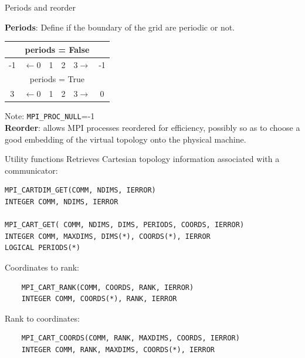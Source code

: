 \documentclass[aspectratio=43]{beamer}
\begin{document}
\begin{frame}[fragile]{Periods and reorder}

\textbf{Periods}: Define if the boundary of the grid are periodic or not.\\
\begin{center}
\begin{tabular}{cccccc}
    \multicolumn{6}{c}{periods = False} \\\hline
    \color{cscsred}-1 & $\leftarrow$\color{cscsblue}0 &\color{cscsblue}1 & \color{cscsblue}2 & {\color{cscsblue}3}$\rightarrow$ & \color{cscsred}-1\\\hline
    \multicolumn{6}{c}{periods = True} \\\hline
    \color{cscsred}3 & $\leftarrow$\color{cscsblue}0 & \color{cscsblue}1 & \color{cscsblue}2 & {\color{cscsblue}3}$\rightarrow$ & \color{cscsred}0\\\hline
\end{tabular}
\end{center}
Note: \verb+MPI_PROC_NULL+=-1\\[0.3cm]

\textbf{Reorder}: allows MPI processes reordered for efficiency, possibly so as to choose a good embedding of the virtual topology onto the physical machine.

\end{frame}

\begin{frame}[fragile]{Utility functions}
Retrieves Cartesian topology information associated with a communicator:
\footnotesize
\begin{verbatim}
MPI_CARTDIM_GET(COMM, NDIMS, IERROR)
INTEGER COMM, NDIMS, IERROR

MPI_CART_GET( COMM, NDIMS, DIMS, PERIODS, COORDS, IERROR)
INTEGER COMM, MAXDIMS, DIMS(*), COORDS(*), IERROR
LOGICAL PERIODS(*)
\end{verbatim}
\normalsize
Coordinates to rank:
\footnotesize
\begin{verbatim}
    MPI_CART_RANK(COMM, COORDS, RANK, IERROR)
    INTEGER COMM, COORDS(*), RANK, IERROR
\end{verbatim}
\normalsize
Rank to coordinates:
\footnotesize
\begin{verbatim}
    MPI_CART_COORDS(COMM, RANK, MAXDIMS, COORDS, IERROR)
    INTEGER COMM, RANK, MAXDIMS, COORDS(*), IERROR
\end{verbatim}
\end{frame}
\end{document}
